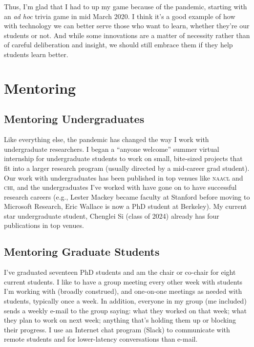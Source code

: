 \documentclass[11pt]{amsart}
\newcommand{\abr}[1]{\textsc{#1}}
\begin{document}
Thus, I'm glad that I had to up my game because of the pandemic,
starting with an \textit{ad hoc} trivia game in mid March 2020.  I
think it's a good example of how with technology we can better serve
those who want to learn, whether they're our students or not.  And
while some innovations are a matter of necessity rather than of
careful deliberation and insight, we should still embrace them if they
help students learn better.

\section{Mentoring}

\subsection{Mentoring Undergraduates}

Like everything else, the pandemic has changed the way I work with
undergraduate researchers.
%
I began a ``anyone welcome'' summer virtual internship for
undergraduate students to work on small, bite-sized projects that fit
into a larger research program (usually directed by a mid-career grad
student).
%
Our work with undergraduates has been published in top venues like
\abr{naacl} and \abr{chi}, and the undergraduates I've worked with
have gone on to have successful research careers (e.g., Lester Mackey
became faculty at Stanford before moving to Microsoft Research, Eric
Wallace is now a PhD student at Berkeley).
%
My current star undergraduate student, Chenglei Si (class of 2024) already
has four publications in top venues.

\subsection{Mentoring Graduate Students}

I've graduated seventeen PhD students and am the chair or co-chair for
eight current students.  I like to have a group meeting every other
week with students I'm working with (broadly construed), and
one-on-one meetings as needed with students, typically once a week. In
addition, everyone in my group (me included) sends a weekly e-mail to
the group saying: what they worked on that week; what they plan to work
on next week; anything that's holding them up or blocking their
progress. I use an Internet chat program (Slack) to communicate with remote
students and for lower-latency conversations than e-mail.
\end{document}
